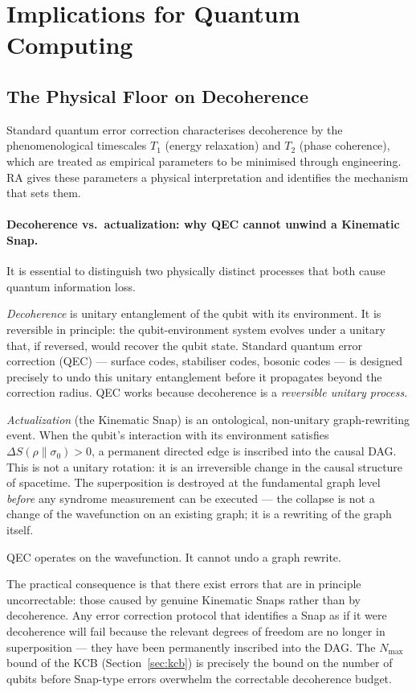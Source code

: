 \documentclass[11pt,a4paper]{article}
\theoremstyle{plain}
\theoremstyle{definition}
\theoremstyle{remark}
\begin{document}
\section{Implications for Quantum Computing}
\label{sec:computing}

\subsection{The Physical Floor on Decoherence}

Standard quantum error correction characterises decoherence by the phenomenological
timescales $T_1$ (energy relaxation) and $T_2$ (phase coherence), which are
treated as empirical parameters to be minimised through engineering. RA gives these
parameters a physical interpretation and identifies the mechanism that sets them.

\paragraph{Decoherence vs.\ actualization: why QEC cannot unwind a Kinematic Snap.}
It is essential to distinguish two physically distinct processes that both
cause quantum information loss.

\emph{Decoherence} is unitary entanglement of the qubit with its environment.
It is reversible in principle: the qubit-environment system evolves under a
unitary that, if reversed, would recover the qubit state. Standard quantum
error correction (QEC) --- surface codes, stabiliser codes, bosonic codes ---
is designed precisely to undo this unitary entanglement before it propagates
beyond the correction radius. QEC works because decoherence is a \emph{reversible
unitary process}.

\emph{Actualization} (the Kinematic Snap) is an ontological, non-unitary
graph-rewriting event. When the qubit's interaction with its environment
satisfies $\Delta S(\rho \| \sigma_0) > 0$, a permanent directed edge is
inscribed into the causal DAG. This is not a unitary rotation: it is an
irreversible change in the causal structure of spacetime. The superposition is
destroyed at the fundamental graph level \emph{before} any syndrome measurement
can be executed --- the collapse is not a change of the wavefunction on an
existing graph; it is a rewriting of the graph itself.

QEC operates on the wavefunction. It cannot undo a graph rewrite.

The practical consequence is that there exist errors that are in principle
uncorrectable: those caused by genuine Kinematic Snaps rather than by
decoherence. Any error correction protocol that identifies a Snap as if it were
decoherence will fail because the relevant degrees of freedom are no longer in
superposition --- they have been permanently inscribed into the DAG. The
$N_{\max}$ bound of the KCB (Section~\ref{sec:kcb}) is precisely the bound
on the number of qubits before Snap-type errors overwhelm the correctable
decoherence budget.
\end{document}

